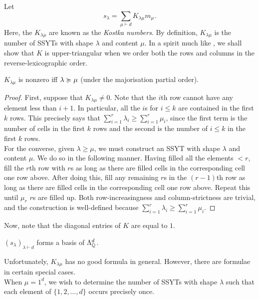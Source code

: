 	Let
	\begin{equation}
		\label{eqn: kostka}
		s_\lambda = \sum_{\mu \vdash d} K_{\lambda\mu} m_\mu.
	\end{equation}
	Here, the $K_{\lambda\mu}$ are known as the \emph{Kostka numbers}. By definition, $K_{\lambda\mu}$ is the number of SSYTs with shape $\lambda$ and content $\mu$. In a spirit much like , we shall show that $K$ is upper-triangular when we order both the rows and columns in the reverse-lexicographic order.

	\begin{ftheo}
		$K_{\lambda\mu}$ is nonzero iff $\lambda \succcurlyeq \mu$ (under the majorisation partial order).
	\end{ftheo}
	\begin{proof}
		First, suppose that $K_{\lambda\mu} \ne 0$. Note that the $i$th row cannot have any element less than $i+1$. In particular, all the $i$s for $i\le k$ are contained in the first $k$ rows. This precisely says that $\sum_{i=1}^r \lambda_i \ge \sum_{i=1}^r \mu_i$, since the first term is the number of cells in the first $k$ rows and the second is the number of $i \le k$ in the first $k$ rows.\\
		For the converse, given $\lambda \ge \mu$, we must construct an SSYT with shape $\lambda$ and content $\mu$. We do so in the following manner. Having filled all the elements $<r$, fill the $r$th row with $r$s as long as there are filled cells in the corresponding cell one row above. After doing this, fill any remaining $r$s in the $(r-1)$th row as long as there are filled cells in the corresponding cell one row above. Repeat this until $\mu_r$ $r$s are filled up. Both row-increasingness and column-strictness are trivial, and the construction is well-defined because $\sum_{i=1}^r \lambda_i \ge \sum_{i=1}^r \mu_i$.
	\end{proof}


	Now, note that the diagonal entries of $K$ are equal to $1$.%
	\begin{fcor}
		$(s_\lambda)_{\lambda \vdash d}$ forms a basis of $\Lambda_{\mathbb{Q}}^d$. 
	\end{fcor}

	Unfortunately, $K_{\lambda\mu}$ has no good formula in general. However, there are formulae in certain special cases.\\
	When $\mu = 1^d$, we wish to determine the number of SSYTs with shape $\lambda$ such that each element of $\{1,2,\ldots,d\}$ occurs precisely once.

